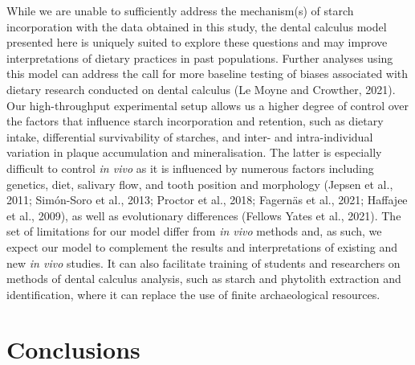 \documentclass[utf8]{../templates/frontiersSCNS}
\begin{document}
While we are unable to sufficiently address the
mechanism(s) of starch incorporation with the data obtained in this study,
the dental calculus model presented here is uniquely suited to explore
these questions and may improve interpretations of dietary practices in past
populations. Further analyses using this model can address the call for more
baseline testing of biases associated with dietary research conducted on dental calculus
(Le Moyne and Crowther, 2021).
Our high-throughput experimental setup allows us a
higher degree of control over the factors that influence starch incorporation and
retention, such as dietary intake, differential survivability of starches,
and inter- and intra-individual variation in plaque accumulation and mineralisation.
The latter is especially difficult to control \emph{in vivo} as it is influenced by
numerous factors including genetics, diet, salivary flow, and tooth position and
morphology
(Jepsen et al., 2011; Simón-Soro et al., 2013; Proctor et al., 2018; Fagernäs et al., 2021; Haffajee et al., 2009),
as well as evolutionary differences (Fellows Yates et al., 2021). The set of
limitations for our model differ from \emph{in vivo} methods and, as such, we expect
our model to complement the results and interpretations of existing and new
\emph{in vivo} studies.
It can also facilitate training of students and researchers on methods of
dental calculus analysis, such as starch and phytolith extraction and
identification, where it can replace the use of finite archaeological resources.

\hypertarget{conclusions}{%
\section{Conclusions}\label{conclusions}}
\end{document}
